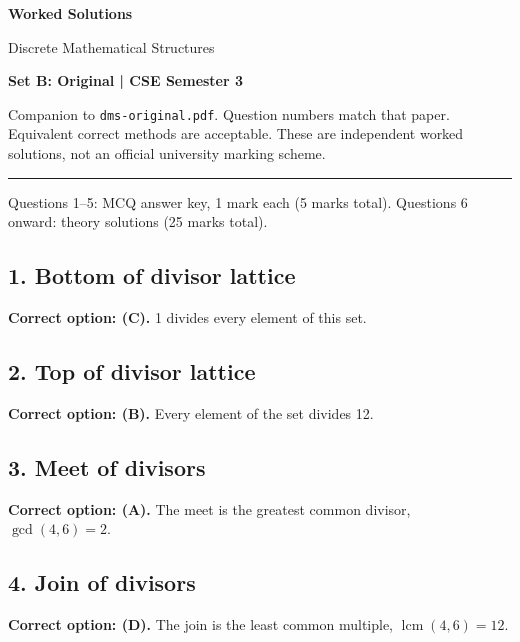 \documentclass[11pt,a4paper]{article}
\begin{document}
{\LARGE\bfseries Worked Solutions}\par{\large Discrete Mathematical Structures}\par\textbf{Set B: Original | CSE Semester 3}\par
Companion to \texttt{dms-original.pdf}. Question numbers match that paper. Equivalent correct methods are acceptable. These are independent worked solutions, not an official university marking scheme.\par\medskip\hrule\medskip
Questions 1--5: MCQ answer key, 1 mark each (5 marks total). Questions 6 onward: theory solutions (25 marks total).\par
\noindent\begin{minipage}{\linewidth}\subsection*{1. Bottom of divisor lattice}
\textbf{Correct option: (C).} 1 divides every element of this set.
\end{minipage}\par\medskip
\noindent\begin{minipage}{\linewidth}\subsection*{2. Top of divisor lattice}
\textbf{Correct option: (B).} Every element of the set divides 12.
\end{minipage}\par\medskip
\noindent\begin{minipage}{\linewidth}\subsection*{3. Meet of divisors}
\textbf{Correct option: (A).} The meet is the greatest common divisor, $\gcd(4,6)=2$.
\end{minipage}\par\medskip
\noindent\begin{minipage}{\linewidth}\subsection*{4. Join of divisors}
\textbf{Correct option: (D).} The join is the least common multiple, $\operatorname{lcm}(4,6)=12$.
\end{minipage}\par\medskip
\end{document}
